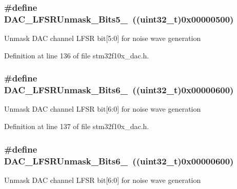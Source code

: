 \subsubsection[{\texorpdfstring{D\+A\+C\+\_\+\+L\+F\+S\+R\+Unmask\+\_\+\+Bits5\+\_\+0}{DAC_LFSRUnmask_Bits5_0}}]{\setlength{\rightskip}{0pt plus 5cm}\#define D\+A\+C\+\_\+\+L\+F\+S\+R\+Unmask\+\_\+\+Bits5\+\_~(({\bf uint32\+\_\+t})0x00000500)}\hypertarget{group___d_a_c__lfsrunmask__triangleamplitude_ga71a01660d410823bfe76a603080dc125}{}\label{group___d_a_c__lfsrunmask__triangleamplitude_ga71a01660d410823bfe76a603080dc125}
Unmask D\+AC channel L\+F\+SR bit\mbox{[}5\+:0\mbox{]} for noise wave generation 

Definition at line 136 of file stm32f10x\+\_\+dac.\+h.

\subsubsection[{\texorpdfstring{D\+A\+C\+\_\+\+L\+F\+S\+R\+Unmask\+\_\+\+Bits6\+\_\+0}{DAC_LFSRUnmask_Bits6_0}}]{\setlength{\rightskip}{0pt plus 5cm}\#define D\+A\+C\+\_\+\+L\+F\+S\+R\+Unmask\+\_\+\+Bits6\+\_~(({\bf uint32\+\_\+t})0x00000600)}\hypertarget{group___d_a_c__lfsrunmask__triangleamplitude_ga48fe2d3f4274d6bf28e446ca0001ed5d}{}\label{group___d_a_c__lfsrunmask__triangleamplitude_ga48fe2d3f4274d6bf28e446ca0001ed5d}
Unmask D\+AC channel L\+F\+SR bit\mbox{[}6\+:0\mbox{]} for noise wave generation 

Definition at line 137 of file stm32f10x\+\_\+dac.\+h.

\subsubsection[{\texorpdfstring{D\+A\+C\+\_\+\+L\+F\+S\+R\+Unmask\+\_\+\+Bits6\+\_\+0}{DAC_LFSRUnmask_Bits6_0}}]{\setlength{\rightskip}{0pt plus 5cm}\#define D\+A\+C\+\_\+\+L\+F\+S\+R\+Unmask\+\_\+\+Bits6\+\_~(({\bf uint32\+\_\+t})0x00000600)}\hypertarget{group___d_a_c__lfsrunmask__triangleamplitude_ga48fe2d3f4274d6bf28e446ca0001ed5d}{}\label{group___d_a_c__lfsrunmask__triangleamplitude_ga48fe2d3f4274d6bf28e446ca0001ed5d}
Unmask D\+AC channel L\+F\+SR bit\mbox{[}6\+:0\mbox{]} for noise wave generation 

